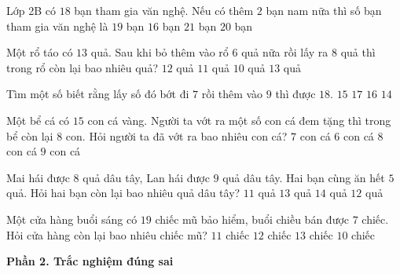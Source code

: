 \begin{ex} %
Lớp 2B có $18$ bạn tham gia văn nghệ. Nếu có thêm $2$ bạn nam nữa thì số bạn tham gia văn nghệ là
\choice
{$19$ bạn}
{$16$ bạn}
{$21$ bạn}
{\True $20$ bạn}
\end{ex}

\begin{ex} %
Một rổ táo có $13$ quả. Sau khi bỏ thêm vào rổ $6$ quả nữa rồi lấy ra $8$ quả thì trong rổ còn lại bao nhiêu quả?
\choice
{$12$ quả}
{\True $11$ quả}
{$10$ quả}
{$13$ quả}
\end{ex}

\begin{ex} %
Tìm một số biết rằng lấy số đó bớt đi $7$ rồi thêm vào $9$ thì được $18$.
\choice
{$15$}
{$17$}
{\True $16$}
{$14$}
\end{ex}

\begin{ex} %
Một bể cá có $15$ con cá vàng. Người ta vớt ra một số con cá đem tặng thì trong bể còn lại $8$ con. Hỏi người ta đã vớt ra bao nhiêu con cá?
\choice
{\True $7$ con cá}
{$6$ con cá}
{$8$ con cá}
{$9$ con cá}
\end{ex}

\begin{ex} %
Mai hái được $8$ quả dâu tây, Lan hái được $9$ quả dâu tây. Hai bạn cùng ăn hết $5$ quả. Hỏi hai bạn còn lại bao nhiêu quả dâu tây?
\choice
{$11$ quả}
{$13$ quả}
{$14$ quả}
{\True $12$ quả}
\end{ex}

\begin{ex} %
Một cửa hàng buổi sáng có $19$ chiếc mũ bảo hiểm, buổi chiều bán được $7$ chiếc. Hỏi cửa hàng còn lại bao nhiêu chiếc mũ?
\choice
{$11$ chiếc}
{\True $12$ chiếc}
{$13$ chiếc}
{$10$ chiếc}
\end{ex}

\textbf{Phần 2. Trắc nghiệm đúng sai}

